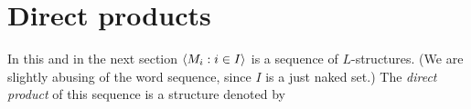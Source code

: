 




  



\section{Direct products}
\label{prodottidiretti}

In this and in the next section $\langle M_i:i\in I\rangle$ is a sequence of $L$-structures.
(We are slightly abusing of the word sequence, since $I$ is a just naked set.)
The \emph{direct product\/} of this sequence is a structure denoted by

